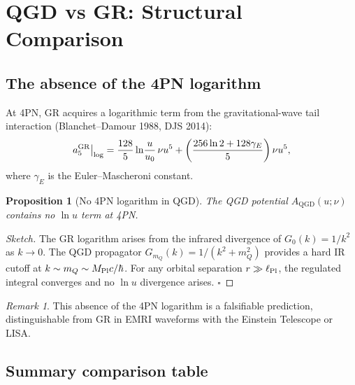 \documentclass[11pt,a4paper]{article}
\theoremstyle{plain}
\newtheorem{proposition}[theorem]{Proposition}
\theoremstyle{definition}
\theoremstyle{remark}
\newtheorem{remark}[theorem]{Remark}
\newcommand{\mQ}{m_Q}
\newcommand{\GR}{\mathrm{GR}}
\newcommand{\QGD}{\mathrm{QGD}}
\begin{document}
\section{QGD vs GR: Structural Comparison}
\label{sec:comparison}

\subsection{The absence of the 4PN logarithm}

At 4PN, GR acquires a logarithmic term from the gravitational-wave
tail interaction (Blanchet--Damour 1988, DJS 2014):
\begin{equation}
  a_5^{\GR}\big|_{\rm log} = \frac{128}{5}\ln\!\frac{u}{u_0}\,\nu u^5
  + \left(\frac{256\ln 2+128\gamma_E}{5}\right)\nu u^5,
  \label{eq:GR_log}
\end{equation}
where $\gamma_E$ is the Euler--Mascheroni constant.

\begin{proposition}[No 4PN logarithm in QGD]
The QGD potential $A_{\QGD}(u;\nu)$ contains no $\ln u$ term at 4PN.
\end{proposition}

\begin{proof}[Sketch]
The GR logarithm arises from the infrared divergence of $G_0(k)=1/k^2$
as $k\to0$.  The QGD propagator $G_{\mQ}(k)=1/(k^2+\mQ^2)$ provides
a hard IR cutoff at $k\sim\mQ\sim M_{\rm Pl}c/\hbar$.  For any orbital
separation $r\gg\ell_{\rm Pl}$, the regulated integral converges and
no $\ln u$ divergence arises.  $\square$
\end{proof}

\begin{remark}
This absence of the 4PN logarithm is a falsifiable prediction,
distinguishable from GR in EMRI waveforms with the Einstein Telescope
or LISA.
\end{remark}

\subsection{Summary comparison table}
\end{document}
